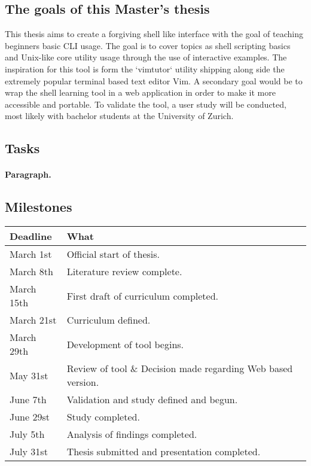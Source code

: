 \documentclass{task_description}
\begin{document}
\subsection*{The goals of this Master's thesis}

This thesis aims to create a forgiving shell like interface with the goal of
teaching beginners basic CLI usage. The goal is to cover topics as shell
scripting basics and Unix-like core utility usage through the use of
interactive examples. The inspiration for this tool is form the `vimtutor`
\cite{pierce_ware_smith_moolenaar_2019} utility shipping along side the
extremely popular terminal based text editor Vim. A secondary goal would be to
wrap the shell learning tool in a web application in order to make it more
accessible and portable. To validate the tool, a user study will be conducted,
most likely with bachelor students at the University of Zurich.

\subsection*{Tasks}
\paragraph{Paragraph.}

\subsection*{Milestones}

\begin{tabular}{lp{10cm}}
Deadline & What \\
\hline\noalign{\smallskip}
March 1st & Official start of thesis. \\
March 8th  & Literature review complete. \\
March 15th & First draft of curriculum completed. \\
March 21st & Curriculum defined. \\
March 29th & Development of tool begins. \\
May 31st  & Review of tool \& Decision made regarding Web based version. \\
June 7th & Validation and study defined and begun. \\
June 29st  & Study completed. \\
July 5th  & Analysis of findings completed. \\
July 31st & Thesis submitted and presentation completed. \\
\end{tabular}
\end{document}
